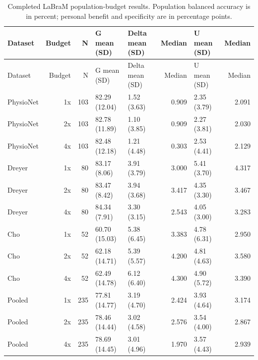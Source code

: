 \begin{longtable}{p{.8in}rrp{.9in}p{1.0in}rp{1.0in}r}
\caption{Completed LaBraM population-budget results. Population balanced accuracy is in percent; personal benefit and specificity are in percentage points.}\label{tab:budget_labram}\\
\toprule
Dataset & Budget & N & G mean (SD) & Delta mean (SD) & Median & U mean (SD) & Median \\
\midrule
\endfirsthead
\toprule
Dataset & Budget & N & G mean (SD) & Delta mean (SD) & Median & U mean (SD) & Median \\
\midrule
\endhead
PhysioNet & 1x & 103 & 82.29 (12.04) & 1.52 (3.63) & 0.909 & 2.35 (3.79) & 2.091 \\
PhysioNet & 2x & 103 & 82.78 (11.89) & 1.10 (3.85) & 0.909 & 2.27 (3.81) & 2.030 \\
PhysioNet & 4x & 103 & 82.48 (12.18) & 1.21 (4.48) & 0.303 & 2.53 (4.41) & 2.129 \\
Dreyer & 1x & 80 & 83.17 (8.06) & 3.91 (3.79) & 3.000 & 5.41 (3.70) & 4.317 \\
Dreyer & 2x & 80 & 83.47 (8.42) & 3.94 (3.68) & 3.417 & 4.35 (3.30) & 3.467 \\
Dreyer & 4x & 80 & 84.34 (7.91) & 3.30 (3.15) & 2.543 & 4.05 (3.00) & 3.283 \\
Cho & 1x & 52 & 60.70 (15.03) & 5.38 (6.45) & 3.383 & 4.78 (6.31) & 2.950 \\
Cho & 2x & 52 & 62.18 (14.71) & 5.39 (5.57) & 4.200 & 4.81 (4.63) & 3.580 \\
Cho & 4x & 52 & 62.49 (14.78) & 6.12 (6.40) & 4.300 & 4.90 (5.72) & 3.390 \\
Pooled & 1x & 235 & 77.81 (14.77) & 3.19 (4.70) & 2.424 & 3.93 (4.64) & 3.174 \\
Pooled & 2x & 235 & 78.46 (14.44) & 3.02 (4.58) & 2.576 & 3.54 (4.00) & 2.867 \\
Pooled & 4x & 235 & 78.69 (14.45) & 3.01 (4.96) & 1.970 & 3.57 (4.43) & 2.939 \\
\bottomrule
\end{longtable}
